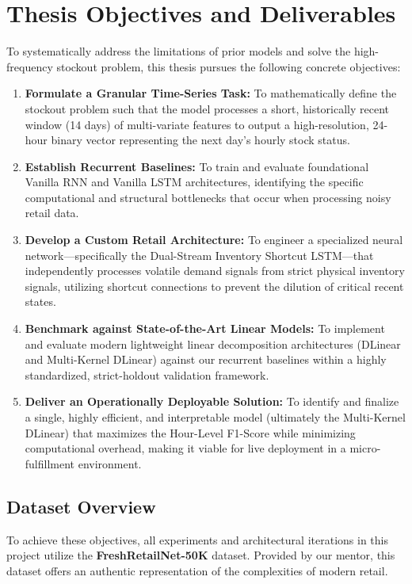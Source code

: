 \chapter{Thesis Objectives and Deliverables}
\label{chap:objectives}

To systematically address the limitations of prior models and solve the high-frequency stockout problem, this thesis pursues the following concrete objectives:

\begin{enumerate}
    \item \textbf{Formulate a Granular Time-Series Task:} To mathematically define the stockout problem such that the model processes a short, historically recent window (14 days) of multi-variate features to output a high-resolution, 24-hour binary vector representing the next day's hourly stock status.
    \item \textbf{Establish Recurrent Baselines:} To train and evaluate foundational Vanilla RNN and Vanilla LSTM architectures, identifying the specific computational and structural bottlenecks that occur when processing noisy retail data.
    \item \textbf{Develop a Custom Retail Architecture:} To engineer a specialized neural network—specifically the Dual-Stream Inventory Shortcut LSTM—that independently processes volatile demand signals from strict physical inventory signals, utilizing shortcut connections to prevent the dilution of critical recent states.
    \item \textbf{Benchmark against State-of-the-Art Linear Models:} To implement and evaluate modern lightweight linear decomposition architectures (DLinear and Multi-Kernel DLinear) against our recurrent baselines within a highly standardized, strict-holdout validation framework.
    \item \textbf{Deliver an Operationally Deployable Solution:} To identify and finalize a single, highly efficient, and interpretable model (ultimately the Multi-Kernel DLinear) that maximizes the Hour-Level F1-Score while minimizing computational overhead, making it viable for live deployment in a micro-fulfillment environment.
\end{enumerate}

\section{Dataset Overview}

To achieve these objectives, all experiments and architectural iterations in this project utilize the \textbf{FreshRetailNet-50K} dataset. Provided by our mentor, this dataset offers an authentic representation of the complexities of modern retail.

